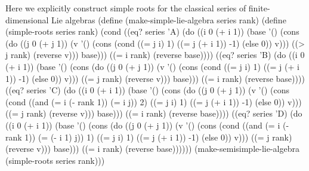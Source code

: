 \documentclass[a4paper,10pt]{article}
\theoremstyle{definition} \newtheorem{Def}{Definition}
\begin{document}
Here we explicitly construct simple roots for the classical series of finite-dimensional Lie algebras
\nwenddocs{}\endmoddef
(define (make-simple-lie-algebra series rank)
  (define (simple-roots series rank)
    (cond ((eq? series 'A)
           (do ((i 0 (+ i 1))
                (base '()
                      (cons 
                       (do ((j 0 (+ j 1))
                            (v '()
                               (cons
                                (cond ((= j i) 1)
                                      ((= j (+ i 1)) -1)
                                      (else 0))
                                v)))
                           ((> j rank) (reverse v)))
                       base)))
               ((= i rank) (reverse base))))
          ((eq? series 'B)
           (do ((i 0 (+ i 1))
                (base '()
                      (cons 
                       (do ((j 0 (+ j 1))
                            (v '()
                               (cons
                                (cond ((= j i) 1)
                                      ((= j (+ i 1)) -1)
                                      (else 0))
                                v)))
                           ((= j rank) (reverse v)))
                       base)))
               ((= i rank) (reverse base))))
          ((eq? series 'C)
           (do ((i 0 (+ i 1))
                (base '()
                      (cons 
                       (do ((j 0 (+ j 1))
                            (v '()
                               (cons
                                (cond ((and (= i (- rank 1)) (= i j)) 2)
                                      ((= j i) 1)
                                      ((= j (+ i 1)) -1)
                                      (else 0))
                                v)))
                           ((= j rank) (reverse v)))
                       base)))
               ((= i rank) (reverse base))))
          ((eq? series 'D)
           (do ((i 0 (+ i 1))
                (base '()
                      (cons 
                       (do ((j 0 (+ j 1))
                            (v '()
                               (cons
                                (cond ((and (= i (- rank 1)) (= (- i 1) j)) 1)
                                      ((= j i) 1)
                                      ((= j (+ i 1)) -1)
                                      (else 0))
                                v)))
                           ((= j rank) (reverse v)))
                       base)))
               ((= i rank) (reverse base))))))
  (make-semisimple-lie-algebra (simple-roots series rank)))
\nwendcode{}\nwdocspar
\end{document}
